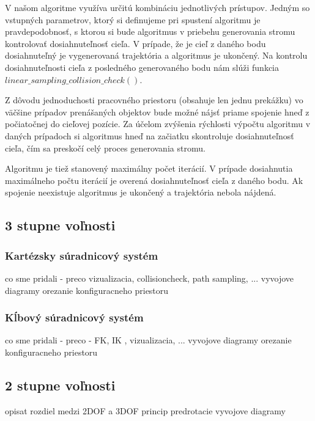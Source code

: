 V našom algoritme využíva určitú kombináciu jednotlivých prístupov.
Jedným so vstupných parametrov, ktorý si definujeme pri spustení algoritmu je pravdepodobnosť, s ktorou si bude algoritmus v priebehu generovania stromu kontrolovať dosiahnuteľnosť cieľa.  V prípade, že je cieľ z daného bodu dosiahnuteľný je vygenerovaná trajektória a algoritmus je ukončený. Na kontrolu dosiahnuteľnosti cieľa z posledného generovaného bodu nám slúži funkcia $ linear\_sampling\_collision\_check()$.

Z dôvodu jednoduchosti pracovného priestoru (obsahuje len jednu prekážku) vo väčšine prípadov prenášaných objektov bude možné nájsť priame spojenie hneď z počiatočnej do cieľovej pozície. Za účelom zvýšenia rýchlosti výpočtu algoritmu v daných prípadoch si algoritmus hneď na začiatku skontroluje dosiahnuteľnosť cieľa, čím sa preskočí celý proces generovania stromu.

Algoritmu je tiež stanovený maximálny počet iterácií. V prípade dosiahnutia maximálneho počtu iterácií je overená dosiahnuteľnosť cieľa z daného bodu. Ak spojenie neexistuje algoritmus je ukončený a trajektória nebola nájdená.

\subsection{3 stupne voľnosti}



\subsubsection{Kartézsky súradnicový systém}

co sme pridali - preco 
 vizualizacia, collisioncheck, path sampling, ...  
 vyvojove diagramy 
 orezanie konfiguracneho priestoru

\subsubsection{Kĺbový súradnicový systém}
 co sme pridali - preco 
 - FK, IK , vizualizacia, ... 
 vyvojove diagramy 
 orezanie konfiguracneho priestoru

\subsection{2 stupne voľnosti}

 opisat rozdiel medzi 2DOF a 3DOF 
 princip predrotacie
 vyvojove diagramy 

